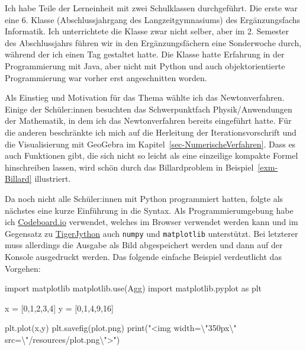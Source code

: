 \documentclass[
  a4paper,
  DIV=11]{scrreprt}
\newenvironment{Shaded}{\begin{snugshade}}{\end{snugshade}}
\newcommand{\BuiltInTok}[1]{\textcolor[rgb]{0.00,0.23,0.31}{#1}}
\newcommand{\CharTok}[1]{\textcolor[rgb]{0.13,0.47,0.30}{#1}}
\newcommand{\DecValTok}[1]{\textcolor[rgb]{0.68,0.00,0.00}{#1}}
\newcommand{\ImportTok}[1]{\textcolor[rgb]{0.00,0.46,0.62}{#1}}
\newcommand{\NormalTok}[1]{\textcolor[rgb]{0.00,0.23,0.31}{#1}}
\newcommand{\OperatorTok}[1]{\textcolor[rgb]{0.37,0.37,0.37}{#1}}
\newcommand{\StringTok}[1]{\textcolor[rgb]{0.13,0.47,0.30}{#1}}
\theoremstyle{definition}
\theoremstyle{definition}
\theoremstyle{remark}
\begin{document}
Ich habe Teile der Lerneinheit mit zwei Schulklassen durchgeführt. Die
erste war eine 6. Klasse (Abschlussjahrgang des Langzeitgymnasiums) des
Ergänzungsfachs Informatik. Ich unterrichtete die Klasse zwar nicht
selber, aber im 2. Semester des Abschlussjahrs führen wir in den
Ergänzungsfächern eine Sonderwoche durch, während der ich einen Tag
gestaltet hatte. Die Klasse hatte Erfahrung in der Programmierung mit
Java, aber nicht mit Python und auch objektorientierte Programmierung
war vorher erst angeschnitten worden.

Als Einstieg und Motivation für das Thema wählte ich das
Newtonverfahren. Einige der Schüler:innen besuchten das Schwerpunktfach
Physik/Anwendungen der Mathematik, in dem ich das Newtonverfahren
bereits eingeführt hatte. Für die anderen beschränkte ich mich auf die
Herleitung der Iterationsvorschrift und die Visualisierung mit GeoGebra
im Kapitel~\ref{sec-NumerischeVerfahren}. Dass es auch Funktionen gibt,
die sich nicht so leicht als eine einzeilige kompakte Formel
hinschreiben lassen, wird schön durch das Billardproblem in
Beispiel~\ref{exm-Billard} illustriert.

Da noch nicht alle Schüler:innen mit Python programmiert hatten, folgte
als nächstes eine kurze Einführung in die Syntax. Als
Programmierumgebung habe ich \href{https://codeboard.io/}{Codeboard.io}
verwendet, welches im Browser verwendet werden kann und im Gegensatz zu
\href{https://tigerjython.ch/}{TigerJython} auch \texttt{numpy} und
\texttt{matplotlib} unterstützt. Bei letzterer muss allerdings die
Ausgabe als Bild abgespeichert werden und dann auf der Konsole
ausgedruckt werden. Das folgende einfache Beispiel verdeutlicht das
Vorgehen:

\begin{Shaded}
\begin{Highlighting}[]
\ImportTok{import}\NormalTok{ matplotlib}
\NormalTok{matplotlib.use(}\StringTok{\textquotesingle{}Agg\textquotesingle{}}\NormalTok{)}
\ImportTok{import}\NormalTok{ matplotlib.pyplot }\ImportTok{as}\NormalTok{ plt}

\NormalTok{x }\OperatorTok{=}\NormalTok{ [}\DecValTok{0}\NormalTok{,}\DecValTok{1}\NormalTok{,}\DecValTok{2}\NormalTok{,}\DecValTok{3}\NormalTok{,}\DecValTok{4}\NormalTok{]}
\NormalTok{y }\OperatorTok{=}\NormalTok{ [}\DecValTok{0}\NormalTok{,}\DecValTok{1}\NormalTok{,}\DecValTok{4}\NormalTok{,}\DecValTok{9}\NormalTok{,}\DecValTok{16}\NormalTok{]}

\NormalTok{plt.plot(x,y)}
\NormalTok{plt.savefig(}\StringTok{\textquotesingle{}plot.png\textquotesingle{}}\NormalTok{)}
\BuiltInTok{print}\NormalTok{(}\StringTok{"\textless{}img width=}\CharTok{\textbackslash{}"}\StringTok{350px}\CharTok{\textbackslash{}"}\StringTok{ src=}\CharTok{\textbackslash{}"}\StringTok{/resources/plot.png}\CharTok{\textbackslash{}"}\StringTok{\textgreater{}"}\NormalTok{)}
\end{Highlighting}
\end{Shaded}
\end{document}
